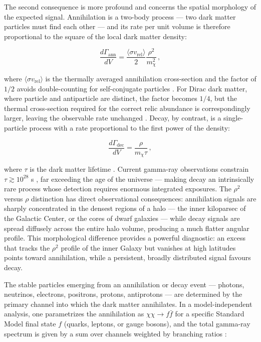 The second consequence is more profound and concerns the spatial morphology of the expected signal.
Annihilation is a two-body process --- two dark matter particles must find each other --- and its rate per unit volume is therefore proportional to the square of the local dark matter density:

\begin{equation}
	\frac{d\Gamma_\text{ann}}{dV} = \frac{\langle \sigma v_\text{rel} \rangle}{2} \frac{\rho^2}{m_\chi^2} \,,
	\label{eq:ann_rate}
\end{equation}

where $\langle \sigma v_\text{rel} \rangle$ is the thermally averaged annihilation cross-section and the factor of $1/2$ avoids double-counting for self-conjugate particles \cite{Hooper:2024}.
For Dirac dark matter, where particle and antiparticle are distinct, the factor becomes $1/4$, but the thermal cross-section required for the correct relic abundance is correspondingly larger, leaving the observable rate unchanged \cite{Hooper:2024}.
Decay, by contrast, is a single-particle process with a rate proportional to the first power of the density:

\begin{equation}
	\frac{d\Gamma_\text{dec}}{dV} = \frac{\rho}{m_\chi \tau} \,,
	\label{eq:dec_rate}
\end{equation}

where $\tau$ is the dark matter lifetime \cite{Hooper:2024}.
Current gamma-ray observations constrain $\tau \gtrsim 10^{28}$ s \cite{Cohen:2016uyg,Blanco_2019}, far exceeding the age of the universe --- making decay an intrinsically rare process whose detection requires enormous integrated exposures.
The $\rho^2$ versus $\rho$ distinction has direct observational consequences: annihilation signals are sharply concentrated in the densest regions of a halo --- the inner kiloparsec of the Galactic Center, or the cores of dwarf galaxies --- while decay signals are spread diffusely across the entire halo volume, producing a much flatter angular profile.
This morphological difference provides a powerful diagnostic: an excess that tracks the $\rho^2$ profile of the inner Galaxy but vanishes at high latitudes points toward annihilation, while a persistent, broadly distributed signal favours decay.

The stable particles emerging from an annihilation or decay event --- photons, neutrinos, electrons, positrons, protons, antiprotons --- are determined by the primary channel into which the dark matter annihilates.
In a model-independent analysis, one parametrizes the annihilation as $\chi\chi \to f\bar{f}$ for a specific Standard Model final state $f$ (quarks, leptons, or gauge bosons), and the total gamma-ray spectrum is given by a sum over channels weighted by branching ratios \cite{Cirelli:2024ssz,Cirelli:2010xx,Arina:2023eic}:

